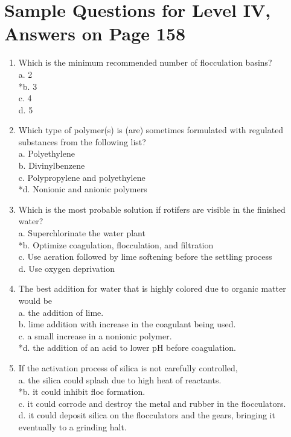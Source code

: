 \section{Sample Questions for Level IV, Answers on Page 158}
\begin{enumerate}[label=TIV-\arabic*]
\item Which is the minimum recommended number of flocculation basins?\\
a. 2\\
*b. 3\\
c. 4\\
d. 5\\
\item Which type of polymer(s) is (are) sometimes formulated with regulated substances from the following list?\\
a. Polyethylene\\
b. Divinylbenzene\\
c. Polypropylene and polyethylene\\
*d. Nonionic and anionic polymers\\
\item Which is the most probable solution if rotifers are visible in the finished water?\\
a. Superchlorinate the water plant\\
*b. Optimize coagulation, flocculation, and filtration\\
c. Use aeration followed by lime softening before the settling process\\
d. Use oxygen deprivation\\
\item The best addition for water that is highly colored due to organic matter would be\\
a. the addition of lime.\\
b. lime addition with increase in the coagulant being used.\\
c. a small increase in a nonionic polymer.\\
*d. the addition of an acid to lower pH before coagulation.\\
\item If the activation process of silica is not carefully controlled,\\
a. the silica could splash due to high heat of reactants.\\
*b. it could inhibit floc formation.\\
c. it could corrode and destroy the metal and rubber in the flocculators.\\
d. it could deposit silica on the flocculators and the gears, bringing it eventually to a grinding halt.\\
\end{enumerate}
